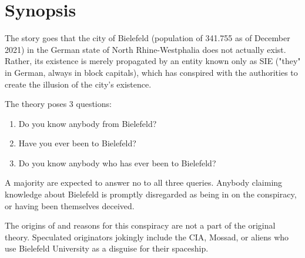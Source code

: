 \section{Synopsis}

The story goes that the city of Bielefeld (population of 341.755 as of December 2021) in the German state of North Rhine-Westphalia does not actually exist. Rather, its existence is merely propagated by an entity known only as SIE ("they" in German, always in block capitals), which has conspired with the authorities to create the illusion of the city's existence.

The theory poses 3 questions:

\begin{enumerate}
\item Do you know anybody from Bielefeld?
\item Have you ever been to Bielefeld?
\item Do you know anybody who has ever been to Bielefeld?
\end{enumerate}

A majority are expected to answer no to all three queries. Anybody claiming knowledge about Bielefeld is promptly disregarded as being in on the conspiracy, or having been themselves deceived.

The origins of and reasons for this conspiracy are not a part of the original theory. Speculated originators jokingly include the CIA, Mossad, or aliens who use Bielefeld University as a disguise for their spaceship.
